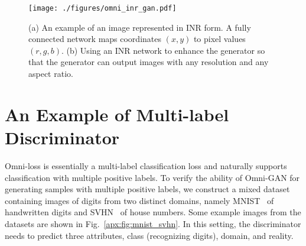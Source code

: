 \documentclass[paper_2425.tex]{subfiles}
\begin{document}
\begin{figure}[t]
  \begin{center}
\texttt{[image: ./figures/omni\_inr\_gan.pdf]}
  \end{center}
  \vspace{-0.5cm}
  \caption{(a) An example of an image represented in INR form. A fully connected network maps coordinates $(x, y)$ to pixel values $(r, g, b)$. (b) Using an INR network to enhance the generator so that the generator can output images with any resolution and any aspect ratio.}
  \label{apx:fig:omni_inr_gan}
\end{figure}



\section{An Example of Multi-label Discriminator}
\label{apx:sec:multi_label_D}


Omni-loss is essentially a multi-label classification loss and naturally supports classification with multiple positive labels. To verify the ability of Omni-GAN for generating samples with multiple positive labels, we construct a mixed dataset containing images of digits from two distinct domains, namely MNIST~\cite{lecun1998gradient} of handwritten digits and SVHN~\cite{netzer2011reading} of house numbers. Some example images from the datasets are shown in Fig.~\ref{apx:fig:mnist_svhn}. In this setting, the discriminator needs to predict three attributes, class (recognizing digits), domain, and reality.
\end{document}
